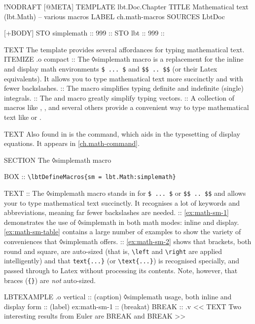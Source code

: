 \begin{lbt}
  !NODRAFT
  [@META]
    TEMPLATE lbt.Doc.Chapter
    TITLE Mathematical text \textsf{(lbt.Math)} -- various macros
    LABEL ch.math-macros
    SOURCES LbtDoc

  [+BODY]
    STO simplemath :: 999 :: 
    STO lbt :: 999 :: \lbtlogo{}

    TEXT The  template provides several affordances for typing mathematical text.
    ITEMIZE .o compact
    :: The ◊simplemath macro is a replacement for the inline and display math environments \Verb|$ ... $| and \Verb|$$ .. $$| (or their Latex equivalents). It allows you to type mathematical text more succinctly and with fewer backslashes.
    :: The  macro simplifies typing definite and indefinite (single) integrals.
    :: The  and  macro greatly simplify typing vectors.
    :: A collection of macros like , ,  and several others provide a convenient way to type mathematical text like  or .

    TEXT Also found in  is the  command, which aids in the typesetting of display equations. It appears in \vref{ch.math-command}.

    SECTION The ◊simplemath macro

    BOX :: \verb|\lbtDefineMacros{sm = lbt.Math:simplemath}|

    TEXT
    :: The ◊simplemath macro stands in for \Verb|$ ... $| or \Verb|$$ .. $$| and allows your to type mathematical text succinctly. It recognises a lot of keywords and abbreviations, meaning far fewer backslashes are needed.
    :: \vref{ex:math-sm-1} demonstrates the use of ◊simplemath in both math modes: inline and display. \vref{ex:math-sm-table} contains a large number of examples to show the variety of conveniences that ◊simplemath offers.
    :: \vref{ex:math-sm-2} shows that brackets, both round and square, are auto-sized (that is, \Verb|\left| and \Verb|\right| are applied intelligently) and that \Verb|text{...}| (or \Verb|\text{...}|) is recognised specially, and passed through to Latex without processing its contents. Note, however, that braces (\Verb|{}|) are \emph{not} auto-sized.

    LBTEXAMPLE .o vertical
    :: (caption) ◊simplemath usage, both inline and display form
    :: (label) ex:math-sm-1
    :: (breakat) BREAK
    :: .v <<
      TEXT Two interesting results from Euler are BREAK  and BREAK 
    >>


\end{lbt}
